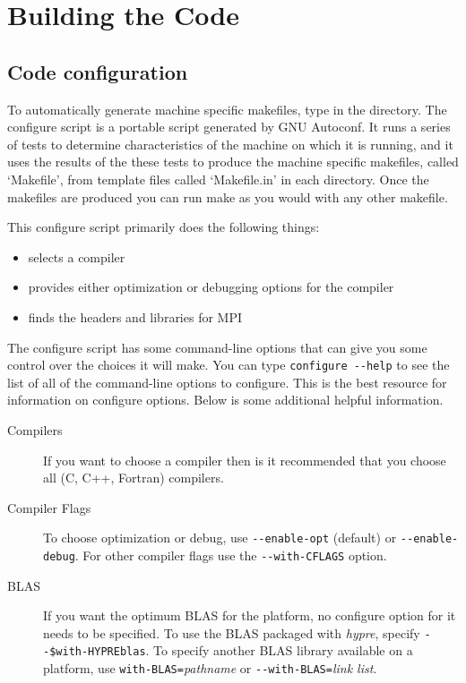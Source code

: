 \chapter{Building the Code}
\section{Code configuration}

To automatically generate machine specific makefiles, type
 in the  directory.  The configure
script is a portable script generated by GNU Autoconf.  It runs a
series of tests to determine characteristics of the machine on which
it is running, and it uses the results of the these tests to produce
the machine specific makefiles, called `Makefile', from template files
called `Makefile.in' in each directory.  Once the makefiles are
produced you can run make as you would with any other makefile.

This configure script primarily does the following things:
\begin{itemize}
\item selects a compiler
\item provides either optimization or debugging options for the compiler
\item finds the headers and libraries for MPI
\end{itemize}

The configure script has some command-line options that can give you
some control over the choices it will make.  You can type
\verb+configure --help+
to see the list of all of the command-line options to configure. This is
the best resource for information on configure options.  Below is some
additional helpful information.


\begin{description}

\item[Compilers] If you want to choose a compiler then is it recommended
that you choose all (C, C++, Fortran) compilers.

\item[Compiler Flags] To choose optimization or debug, use
\verb+--enable-opt+ (default) or \verb+--enable-debug+.
For other compiler flags use the \verb+--with-CFLAGS+ option.  

\item[BLAS] If you want the optimum BLAS for the platform,
no configure option for it needs to be specified.
To use the BLAS packaged with {\slshape hypre},
specify \verb+--$with-HYPREblas+.
To specify another BLAS library available on a
platform, use \verb+with-BLAS=+{\itshape pathname} or
\verb+--with-BLAS=+{\itshape link list}.

\end{description}

